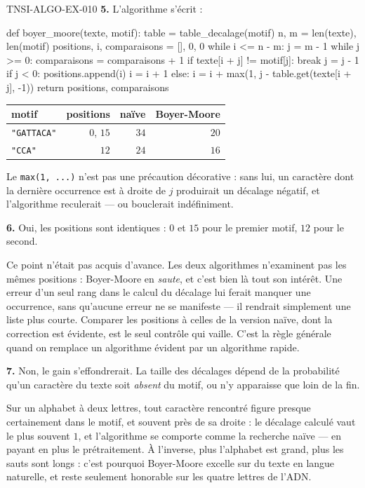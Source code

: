 \begin{corrige}{TNSI-ALGO-EX-010}
\textbf{5.} L'algorithme s'écrit :
\begin{python}
def boyer_moore(texte, motif):
    table = table_decalage(motif)
    n, m = len(texte), len(motif)
    positions, i, comparaisons = [], 0, 0
    while i <= n - m:
        j = m - 1
        while j >= 0:
            comparaisons = comparaisons + 1
            if texte[i + j] != motif[j]:
                break
            j = j - 1
        if j < 0:
            positions.append(i)
            i = i + 1
        else:
            i = i + max(1, j - table.get(texte[i + j], -1))
    return positions, comparaisons
\end{python}

\begin{center}
\begin{tabular}{lrrr}
\hline
motif & positions & naïve & Boyer-Moore \\
\hline
\lstinline{"GATTACA"} & $0$, $15$ & $34$ & $20$ \\
\lstinline{"CCA"} & $12$ & $24$ & $16$ \\
\hline
\end{tabular}
\end{center}

Le \lstinline{max(1, ...)} n'est pas une précaution décorative : sans lui, un
caractère dont la dernière occurrence est à droite de $j$ produirait un décalage
négatif, et l'algorithme reculerait — ou bouclerait indéfiniment.

\textbf{6.} Oui, les positions sont identiques : $0$ et $15$ pour le premier
motif, $12$ pour le second.

Ce point n'était pas acquis d'avance. Les deux algorithmes n'examinent pas les
mêmes positions : Boyer-Moore en \emph{saute}, et c'est bien là tout son intérêt.
Une erreur d'un seul rang dans le calcul du décalage lui ferait manquer une
occurrence, sans qu'aucune erreur ne se manifeste — il rendrait simplement une
liste plus courte. Comparer les positions à celles de la version naïve, dont la
correction est évidente, est le seul contrôle qui vaille. C'est la règle générale
quand on remplace un algorithme évident par un algorithme rapide.

\textbf{7.} Non, le gain s'effondrerait. La taille des décalages dépend de la
probabilité qu'un caractère du texte soit \emph{absent} du motif, ou n'y
apparaisse que loin de la fin.

Sur un alphabet à deux lettres, tout caractère rencontré figure presque
certainement dans le motif, et souvent près de sa droite : le décalage calculé
vaut le plus souvent $1$, et l'algorithme se comporte comme la recherche naïve —
en payant en plus le prétraitement. À l'inverse, plus l'alphabet est grand, plus
les sauts sont longs : c'est pourquoi Boyer-Moore excelle sur du texte en langue
naturelle, et reste seulement honorable sur les quatre lettres de l'ADN.
\end{corrige}
